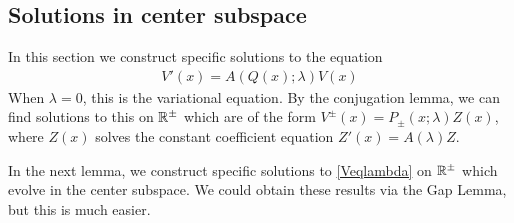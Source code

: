 \documentclass[thesis.tex]{subfiles}
\begin{document}
\subsection{Solutions in center subspace}\label{sec:centersol}

In this section we construct specific solutions to the equation
\begin{align}
V'(x) = A(Q(x); \lambda) V(x) \label{Veqlambda}
\end{align}
When $\lambda = 0$, this is the variational equation. By the conjugation lemma, we can find solutions to this on $\mathbb{R}^\pm$ which are of the form $V^\pm(x) = P_\pm(x; \lambda)Z(x)$, where $Z(x)$ solves the constant coefficient equation $Z'(x) = A(\lambda)Z$.

In the next lemma, we construct specific solutions to \eqref{Veqlambda} on $\mathbb{R}^\pm$ which evolve in the center subspace. We could obtain these results via the Gap Lemma, but this is much easier.
\end{document}
